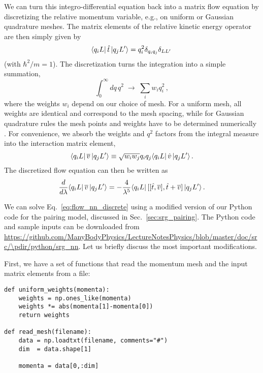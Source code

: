 {We can turn this integro-differential equation back into a matrix 
flow equation by discretizing the relative momentum variable, e.g.,
on uniform or Gaussian quadrature meshes. The matrix elements of the 
relative kinetic energy operator are then simply given by
\begin{equation}
  \langle{q_iL}|\,{\hat{t}}\,|{q_jL'}\rangle=q_i^2 \delta_{q_iq_j}\delta_{LL'}\,
\end{equation}
(with $\hbar^2/m=1$). The discretization turns the integration
into a simple summation,
\begin{equation}
  \int_0^\infty dq\,q^2\;\rightarrow\;\sum_{i}w_i q^2_i\,,
\end{equation}
where the weights $w_i$ depend on our choice of mesh. For a uniform
mesh, all weights are identical and correspond to the mesh spacing,
while for Gaussian quadrature rules the mesh points and weights have
to be determined numerically \cite{Press:2007vn}. For convenience,
we absorb the weights and $q^2$ factors from the integral measure into 
the interaction matrix element,
\begin{equation}
  \langle{q_iL}|\,{\overline{v}}\,|{q_jL'}\rangle \equiv \sqrt{w_iw_j}q_i q_j\langle{q_iL}|\,{\hat{v}}\,|{q_jL'}\rangle\,.
\end{equation}
The discretized flow equation can then be written as
\begin{equation}\label{eq:flow_nn_discrete}
  \totd{}{\lambda} \matrixe{q_iL}{\overline{v}}{q_jL'} = - \frac{4}{\lambda^5}
    \matrixe{q_iL}{\comm{\comm{\tO}{\overline{v}}}{\tO+\overline{v}}}{q_jL'}\,.
\end{equation}

We can solve Eq.~\eqref{eq:flow_nn_discrete} using a modified version of our 
Python code for the pairing model, discussed in Sec.~\ref{sec:srg_pairing}.
The Python code and sample inputs can be downloaded from 
\url{https://github.com/ManyBodyPhysics/LectureNotesPhysics/blob/master/doc/src/\pdir/python/srg_nn}.
Let us briefly discuss the most important modifications.

First, we have a set of functions that read the momentum mesh
and the input matrix elements from a file:
\begin{lstlisting}
def uniform_weights(momenta):
    weights = np.ones_like(momenta)
    weights *= abs(momenta[1]-momenta[0])
    return weights

def read_mesh(filename):
    data = np.loadtxt(filename, comments="#")  
    dim  = data.shape[1]
    
    momenta = data[0,:dim]


\end{lstlisting}}
